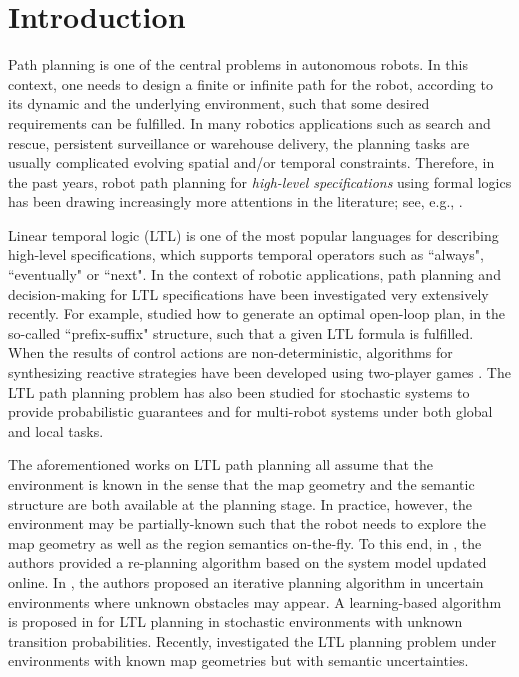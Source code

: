 \documentclass{ifacconf}
\begin{document}
\section{Introduction}


Path planning is one of the central problems in autonomous robots. In this context, one needs to design a finite or infinite path for the robot, according to its dynamic and the underlying environment, such that some desired requirements can be fulfilled. In many robotics applications such as search and rescue, persistent surveillance or warehouse delivery, the planning tasks are usually complicated evolving spatial and/or temporal constraints. Therefore,  in the past years,   robot path planning for \emph{high-level specifications} using formal logics has been drawing increasingly more attentions in the literature; see, e.g., \cite{kress2018synthesis,mahulea2020path,kloetzer2020path,yu2022security}. 

Linear temporal logic (LTL) is one of the most popular languages for describing high-level specifications, which supports temporal operators such as ``always", ``eventually" or ``next". In the context of robotic applications, path planning and decision-making for LTL specifications have been investigated very extensively recently. 
For example, \cite{smith2011optimal} studied how to generate an optimal open-loop plan, in the so-called ``prefix-suffix" structure, such that a given LTL formula is fulfilled.
When the results of control actions are non-deterministic, algorithms for synthesizing reactive strategies have been developed using two-player games \cite{fu2016synthesis}. The LTL path planning problem has also been studied for stochastic systems \cite{guo2018probabilistic} to provide probabilistic guarantees and  for multi-robot systems \cite{yu2022distributed} under both global and local tasks.  

The aforementioned works on LTL path planning all assume that the environment is known in the sense that the map geometry and the semantic structure are both available at the planning stage. In practice, however, the environment may be partially-known such that the robot needs to explore the map geometry as well as the region semantics on-the-fly. To this end, in \cite{guo2015multi}, the authors provided a re-planning algorithm based on the system model updated online.  In  \cite{lahijanian2016iterative}, the authors proposed an iterative planning algorithm in uncertain environments where unknown obstacles may appear. A learning-based algorithm is proposed in \cite{cai2021learning} for LTL planning in stochastic environments with unknown transition probabilities. Recently, \cite{kantaros2022perception} investigated the LTL planning problem under environments with known map geometries  but with semantic uncertainties.   
  
\end{document}
